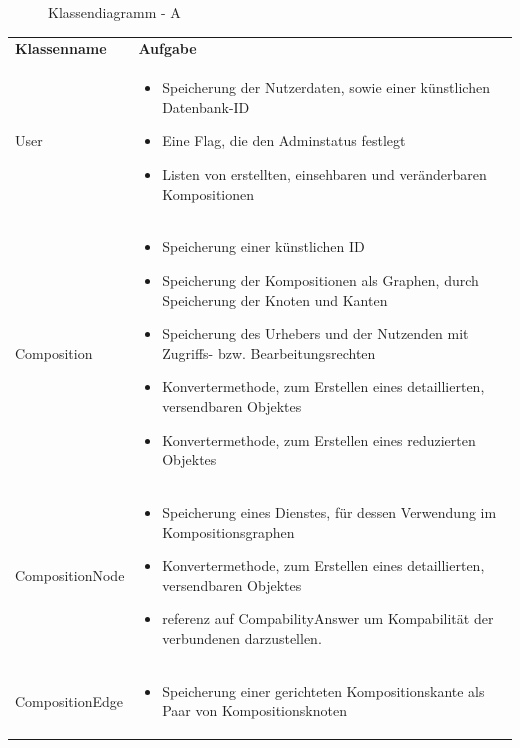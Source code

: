 \makeatletter
\newcommand*{\compress}{\@minipagetrue}
\makeatother

\begin{figure}[h]
	\centering
	\caption{Klassendiagramm - A}
	\label{fig:klassendiagramm-a}
\end{figure}

\begin{table}[h]
	\centering
	\begin{tabularx}{\textwidth}{p{} | X} 
		\rowcolor[HTML]{C0C0C0}
		\textbf{Klassenname} & \textbf{Aufgabe} \\
		User & \compress \begin{itemize}
			\item Speicherung der Nutzerdaten, sowie einer künstlichen Datenbank-ID
			\item Eine Flag, die den Adminstatus festlegt
			\item Listen von erstellten, einsehbaren und veränderbaren Kompositionen
		\end{itemize}\\
		\rowcolor[HTML]{E7E7E7}
		Composition & \compress \begin{itemize}
		  \item Speicherung einer künstlichen ID
			\item Speicherung der Kompositionen als Graphen, durch Speicherung der Knoten und Kanten
			\item Speicherung des Urhebers und der Nutzenden mit Zugriffs- bzw. Bearbeitungsrechten
			\item Konvertermethode, zum Erstellen eines detaillierten, versendbaren Objektes
			\item Konvertermethode, zum Erstellen eines reduzierten Objektes
		\end{itemize} \\
		CompositionNode & \compress \begin{itemize}
			\item Speicherung eines Dienstes, für dessen Verwendung im Kompositionsgraphen
			\item Konvertermethode, zum Erstellen eines detaillierten, versendbaren Objektes
			\item referenz auf CompabilityAnswer um Kompabilität der verbundenen darzustellen. 
		\end{itemize} \\
		\rowcolor[HTML]{E7E7E7}
		CompositionEdge & \compress \begin{itemize}
			\item Speicherung einer gerichteten Kompositionskante als Paar von Kompositionsknoten

\end{itemize}
\end{tabularx}
\end{table}

